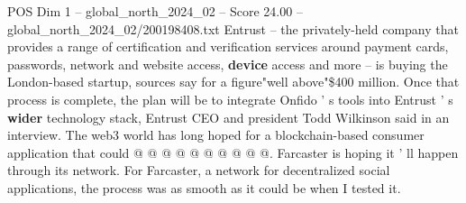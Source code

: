 \begin{textsample}{POS Dim 1 – global\_north\_2024\_02 – Score 24.00 – global\_north\_2024\_02/200198408.txt}
Entrust -- the privately-held company that provides a range of certification and verification services around payment cards, passwords, network and website access, \textbf{device} access and more -- is buying the London-based startup, sources say for a figure"well above"\$400 million.
Once that process is complete, the plan will be to integrate Onfido ' s tools into Entrust ' s \textbf{wider} technology stack, Entrust CEO and president Todd Wilkinson said in an interview.
The web3 world has long hoped for a blockchain-based consumer application that could @ @ @ @ @ @ @ @ @ @.
Farcaster is hoping it ' ll happen through its network.
For Farcaster, a network for decentralized social applications, the process was as smooth as it could be when I tested it.

\end{textsample}
